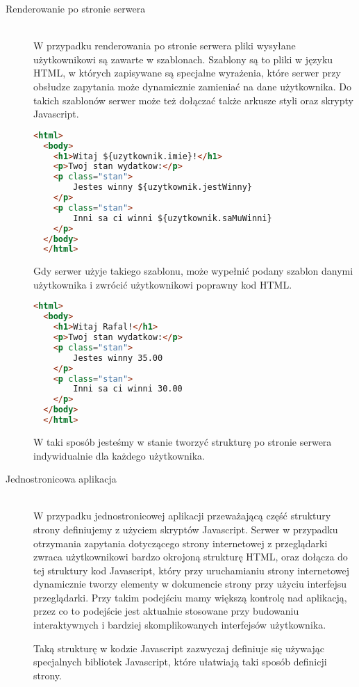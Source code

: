 \begin{description}
  \item[Renderowanie po stronie serwera] \hfill \\ W przypadku renderowania po stronie serwera pliki wysyłane użytkownikowi są zawarte w szablonach. Szablony są to pliki w języku HTML, w których zapisywane są specjalne wyrażenia, które serwer przy obsłudze zapytania może dynamicznie zamieniać na dane użytkownika. Do takich szablonów serwer może też dołączać także arkusze styli oraz skrypty Javascript.
  \begin{lstlisting}[language=HTML, caption=Przykład szablonu w Freemaker]
  <html>
  <body>
    <h1>Witaj ${uzytkownik.imie}!</h1>
    <p>Twoj stan wydatkow:</p>
    <p class="stan">
        Jestes winny ${uzytkownik.jestWinny}
    </p>
    <p class="stan">
        Inni sa ci winni ${uzytkownik.saMuWinni}
    </p>
  </body>
  </html>
  \end{lstlisting}

  Gdy serwer użyje takiego szablonu, może wypełnić podany szablon danymi użytkownika i zwrócić użytkownikowi poprawny kod HTML.

  \begin{lstlisting}[language=HTML, caption=Przykład szablonu w Freemaker]
  <html>
  <body>
    <h1>Witaj Rafal!</h1>
    <p>Twoj stan wydatkow:</p>
    <p class="stan">
        Jestes winny 35.00
    </p>
    <p class="stan">
        Inni sa ci winni 30.00
    </p>
  </body>
  </html>
  \end{lstlisting}
  W taki sposób jesteśmy w stanie tworzyć strukturę po stronie serwera indywidualnie dla każdego użytkownika.

  \item[Jednostronicowa aplikacja] \hfill \\ W przypadku jednostronicowej aplikacji przeważającą część struktury strony definiujemy z użyciem skryptów Javascript. Serwer w przypadku otrzymania zapytania dotyczącego strony internetowej z przeglądarki zwraca użytkownikowi bardzo okrojoną strukturę HTML, oraz dołącza do tej struktury kod Javascript, który przy uruchamianiu strony internetowej dynamicznie tworzy elementy w dokumencie strony przy użyciu interfejsu przeglądarki. Przy takim podejściu mamy większą kontrolę nad aplikacją, przez co to podejście jest aktualnie stosowane przy budowaniu interaktywnych i bardziej skomplikowanych interfejsów użytkownika.

  Taką strukturę w kodzie Javascript zazwyczaj definiuje się używając specjalnych bibliotek Javascript, które ułatwiają taki sposób definicji strony.


\end{description}
